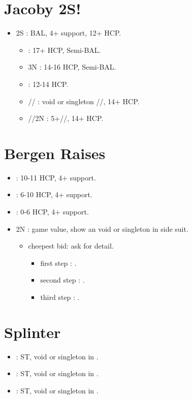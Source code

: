 \documentclass[12pt,twoside,a5paper]{report}%
\begin{document}
	\section*{Jacoby 2S!}
	\begin{itemize}
	\renewcommand{\labelitemi}{}
	\item 2S : BAL, 4+\he{} support, 12+ HCP.
		\begin{itemize}
		\renewcommand{\labelitemi}{--}
		\item {} : 17+ HCP, Semi-BAL.
		\item 3N : 14-16 HCP, Semi-BAL.
		\item {} : 12-14 HCP.
		\item {}// : void or singleton //, 14+ HCP.
		\item {}//2N : 5+//, 14+ HCP.
		\end{itemize}
	\end{itemize}

	\section*{Bergen Raises}
	\begin{itemize}
	\renewcommand{\labelitemi}{}
	\item {} : 10-11 HCP, 4+\he{} support.
	\item {} : 6-10 HCP, 4+\he{} support.
	\item {} : 0-6 HCP, 4+\he{} support.
	\item 2N : game value, show an void or singleton in side suit.
		\begin{itemize}
		\renewcommand{\labelitemi}{--}
		\item cheepest bid: ask for detail.
			\begin{itemize}
			\renewcommand{\labelitemi}{--}
				\item first step : \cl{}.
				\item second step : \di{}.
				\item third step : \sp{}.
			\end{itemize}
		\end{itemize}
	\end{itemize}

	\section*{Splinter}
	\begin{itemize}
	\renewcommand{\labelitemi}{}
	\item {} : ST, void or singleton in \cl{}.
	\item {} : ST, void or singleton in \di{}.
	\item {} : ST, void or singleton in \sp{}.
	\end{itemize}
\end{document}
